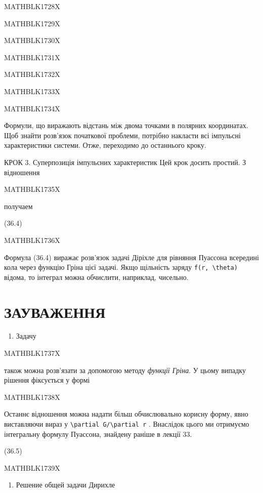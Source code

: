 \documentclass[
  ukrainian,
]{article}
\providecommand{\tightlist}{%
  \setlength{\itemsep}{0pt}\setlength{\parskip}{0pt}}
\begin{document}
MATHBLK1728X

MATHBLK1729X

MATHBLK1730X

MATHBLK1731X

MATHBLK1732X

MATHBLK1733X

MATHBLK1734X

Формули, що виражають відстань між двома точками в полярних координатах.
Щоб знайти розв'язок початкової проблеми, потрібно накласти всі
імпульсні характеристики системи. Отже, переходимо до останнього кроку.

КРОК 3. Суперпозиція імпульсних характеристик Цей крок досить простий. З
відношення

MATHBLK1735X

получаем

(36.4)

MATHBLK1736X

Формула (36.4) виражає розв'язок задачі Діріхле для рівняння Пуассона
всередині кола через функцію Гріна цієї задачі. Якщо щільність заряду
\texttt{f(r,\ \textbackslash{}theta)} відома, то інтеграл можна
обчислити, наприклад, чисельно.

\section{ЗАУВАЖЕННЯ}\label{ux437ux430ux443ux432ux430ux436ux435ux43dux43dux44f}

\begin{enumerate}
\def\labelenumi{\arabic{enumi}.}
\tightlist
\item
  Задачу
\end{enumerate}

MATHBLK1737X

також можна розв'язати за допомогою методу \emph{функції Гріна}. У цьому
випадку рішення фіксується у формі

MATHBLK1738X

Останнє відношення можна надати більш обчислювально корисну форму, явно
виставляючи вираз у
\texttt{\textbackslash{}partial\ G/\textbackslash{}partial\ r} .
Внаслідок цього ми отримуємо інтегральну формулу Пуассона, знайдену
раніше в лекції 33.

(36.5)

MATHBLK1739X

\begin{enumerate}
\def\labelenumi{\arabic{enumi}.}
\setcounter{enumi}{1}
\tightlist
\item
  Решение общей задачи Дирихле
\end{enumerate}
\end{document}
